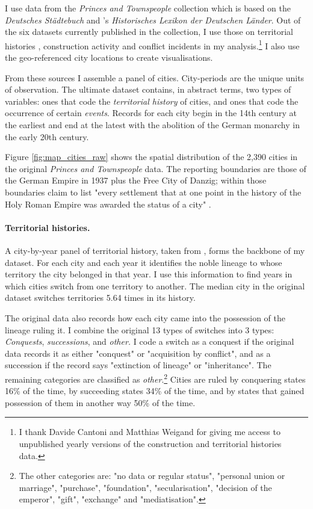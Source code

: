 \documentclass[11pt, a4paper]{article}
\begin{document}
I use data from the \textit{Princes and Townspeople} collection which is based on the \textit{Deutsches Städtebuch} \citep{keyser1939} and \cite{kobler2007}'s \textit{Historisches Lexikon der Deutschen Länder}. Out of the six datasets currently published in the collection, I use those on territorial histories \citep{pt2}, construction activity \citep{pt5} and conflict incidents \citep{pt6} in my analysis.\footnote{I thank Davide Cantoni and Matthias Weigand for giving me access to unpublished yearly versions of the construction and territorial histories data.} I also use the geo-referenced city locations \citep{pt1} to create visualisations. 

From these sources I assemble a panel of cities. City-periods are the unique units of observation. The ultimate dataset contains, in abstract terms, two types of variables: ones that code the \textit{territorial history} of cities, and ones that code the occurrence of certain \textit{events}. Records for each city begin in the 14th century at the earliest and end at the latest with the abolition of the German monarchy in the early 20th century. 

Figure \ref{fig:map_cities_raw} shows the spatial distribution of the 2,390 cities in the original \textit{Princes and Townspeople} data. The reporting boundaries are those of the German Empire in 1937 plus the Free City of Danzig; within those boundaries \cite{keyser1939} claim to list "every settlement that at one point in the history of the Holy Roman Empire was awarded the status of a city" \citep[p. 2]{pt1}.

\paragraph{Territorial histories.} 

A city-by-year panel of territorial history, taken from \cite{pt2}, forms the backbone of my dataset. For each city and each year it identifies the noble lineage to whose territory the city belonged in that year. I use this information to find years in which cities switch from one territory to another. The median city in the original dataset switches territories 5.64 times in its history. 

The original data also records how each city came into the possession of the lineage ruling it. I combine the original 13 types of switches into 3 types: \textit{Conquests}, \textit{successions}, and \textit{other.} I code a switch as a conquest if the original data records it as either "conquest" or "acquisition by conflict", and as a succession if the record says "extinction of lineage" or "inheritance". The remaining categories are classified as \textit{other}.\footnote
{
The other categories are: "no data or regular status", "personal union or marriage", "purchase", "foundation", "secularisation", "decision of the emperor", "gift", "exchange" and "mediatisation".
} 
Cities are ruled by conquering states 16\% of the time, by succeeding states 34\% of the time, and by states that gained possession of them in another way 50\% of the time.
\end{document}

